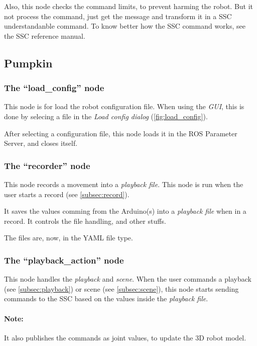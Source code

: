 \documentclass[oneside,a4paper,titlepage]{article}
\begin{document}
Also, this node checks the command limits, to prevent harming the robot. But it not process the command, just get the message and transform it in a SSC understandanble command. To know better how the SSC command works, see the SSC reference manual.

\subsection{Pumpkin}

\subsubsection{The ``load\_config'' node}

This node is for load the robot configuration file. When using the \emph{GUI}, this is done by selecing a file in the \emph{Load config dialog} (\ref{fig:load_config}).

After selecting a configuration file, this node loads it in the ROS Parameter Server, and closes itself.

\subsubsection{The ``recorder'' node}

This node records a movement into a \emph{playback file}. This node is run when the user starts a record (see \ref{subsec:record}).

It saves the values comming from the Arduino(s) into a \emph{playback file} when in a record. It controls the file handling, and other stuffs.

The files are, now, in the YAML file type.

\subsubsection{The ``playback\_action'' node}

This node handles the \emph{playback} and \emph{scene}. When the user commands a playback (see \ref{subsec:playback}) or scene (see \ref{subsec:scene}), this node starts sending commands to the SSC based on the values inside the \emph{playback file}.

\paragraph{Note: }It also publishes the commands as joint values, to update the 3D robot model.
\end{document}
